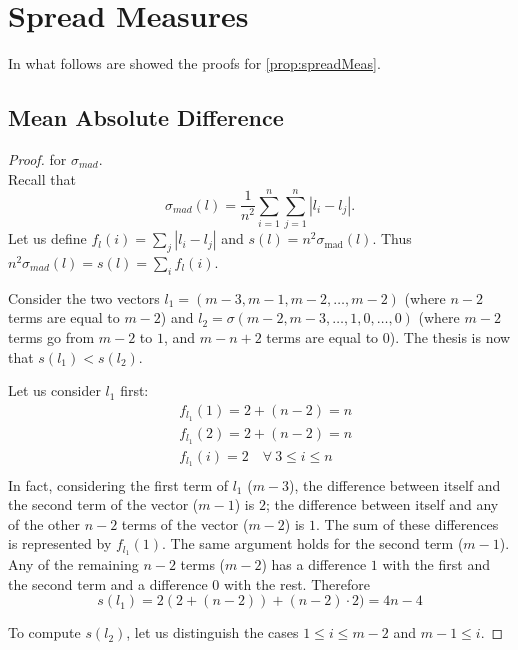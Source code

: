 \appendix

\newcommand{\smad}{\sigma_\text{mad}}

\section{Spread Measures}
\label{apdx:proofSM}
In what follows are showed the proofs for \cref{prop:spreadMeas}.
\subsection{Mean Absolute Difference}
\begin{proof} for $\sigma_{mad}$. \\
	\label{proof:sigmamad}
	Recall that 
	\[\sigma_{mad}(l)= \frac{1}{n^2} \sum_{i=1}^{n}\sum_{j=1}^{n}|l_i-l_j|.\]
	Let us define $f_l(i)= \sum_{j}|l_i-l_j|$ and $s(l) = n^2 \smad(l)$. Thus $n^2 \sigma_{mad}(l) = s(l)= \sum_{i} f_l(i)$.
	
	Consider the two vectors $l_1=(m-3, m-1, m-2, \dots, m-2)$ (where $n-2$ terms are equal to $m-2$) and $l_2=\sigma(m-2, m-3, \dots, 1, 0, \dots, 0)$ (where $m-2$ terms go from $m-2$ to $1$, and $m-n+2$ terms are equal to $0$). 
	The thesis is now that $s(l_1) < s(l_2)$.
	
	Let us consider $l_1$ first: 
	\begin{align*}
		&f_{l_1}(1)= 2+(n-2)=n \\
		&f_{l_1}(2)= 2+(n-2)=n \\
		&f_{l_1}(i)= 2 \quad \forall \ 3\leq i \leq n \\ 
	\end{align*}
	In fact, considering the first term of $l_1$ ($m-3$), the difference between itself and the second term of the vector ($m-1$) is $2$; the difference between itself and any of the other $n-2$ terms of the vector ($m-2$) is $1$. The sum of these differences is represented by $f_{l_1}(1)$. The same argument holds for the second term ($m-1$). Any of the remaining $n-2$ terms ($m-2$) has a difference $1$ with the first and the second term and a difference $0$ with the rest. Therefore 
	\[s(l_1) =2(2+(n-2))+(n-2)\cdot2)= 4n-4\]
	
	To compute $s(l_2)$, let us distinguish the cases $1 ≤ i ≤ m - 2$ and $m - 1 ≤ i$.
	

\end{proof}
